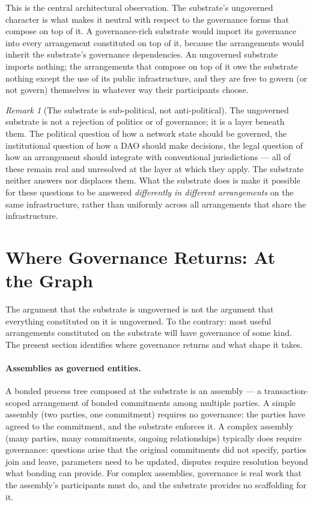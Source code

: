 \documentclass[11pt,a4paper]{article}
\theoremstyle{remark}
\newtheorem{remark}{Remark}[section]
\begin{document}
This is the central architectural observation. The substrate's
ungoverned character is what makes it neutral with respect to
the governance forms that compose on top of it. A
governance-rich substrate would import its governance into
every arrangement constituted on top of it, because the
arrangements would inherit the substrate's governance
dependencies. An ungoverned substrate imports nothing; the
arrangements that compose on top of it owe the substrate
nothing except the use of its public infrastructure, and they
are free to govern (or not govern) themselves in whatever way
their participants choose.

\begin{remark}[The substrate is sub-political, not anti-political]
The ungoverned substrate is not a rejection of politics or of
governance; it is a layer beneath them. The political question
of how a network state should be governed, the institutional
question of how a DAO should make decisions, the legal
question of how an arrangement should integrate with
conventional jurisdictions --- all of these remain real and
unresolved at the layer at which they apply. The substrate
neither answers nor displaces them. What the substrate does is
make it possible for these questions to be answered
\emph{differently in different arrangements} on the same
infrastructure, rather than uniformly across all arrangements
that share the infrastructure.
\end{remark}

\section{Where Governance Returns: At the Graph}
\label{sec:graph-governance}

The argument that the substrate is ungoverned is not the
argument that everything constituted on it is ungoverned. To the
contrary: most useful arrangements constituted on the substrate
will have governance of some kind. The present section
identifies where governance returns and what shape it takes.

\paragraph{Assemblies as governed entities.}
A bonded process tree composed at the substrate is an
assembly --- a transaction-scoped arrangement of bonded
commitments among multiple parties. A
simple assembly (two parties, one commitment) requires no
governance: the parties have agreed to the commitment, and the
substrate enforces it. A complex assembly (many parties, many
commitments, ongoing relationships) typically does require
governance: questions arise that the original commitments did
not specify, parties join and leave, parameters need to be
updated, disputes require resolution beyond what bonding can
provide. For complex assemblies, governance is real work that
the assembly's participants must do, and the substrate provides
no scaffolding for it.
\end{document}
